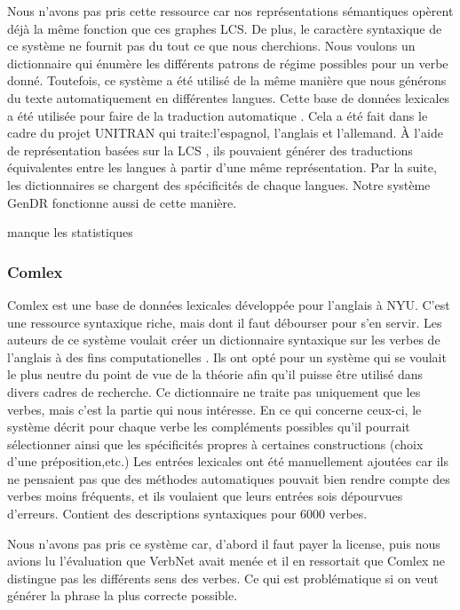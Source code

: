 Nous n'avons pas pris cette ressource car nos représentations sémantiques opèrent déjà la même fonction que ces graphes LCS. De plus, le caractère syntaxique de ce système ne fournit pas du tout ce que nous cherchions. Nous voulons un dictionnaire qui énumère les différents patrons de régime possibles pour un verbe donné. Toutefois, ce système a été utilisé de la même manière que nous générons du texte automatiquement en différentes langues. Cette base de données lexicales a été utilisée pour faire de la traduction automatique \citep{DorrUseLexicalSemantics1992}. Cela a été fait dans le cadre du projet UNITRAN qui traite:l'espagnol, l'anglais et l'allemand. À l'aide de représentation basées sur la LCS , ils pouvaient générer des traductions équivalentes entre les langues à partir d'une même représentation. Par la suite, les dictionnaires se chargent des spécificités de chaque langues. Notre système GenDR fonctionne aussi de cette manière.

manque les statistiques

\subsubsection{Comlex}
Comlex est une base de données lexicales développée pour l'anglais à NYU. C'est une ressource syntaxique riche, mais dont il faut débourser pour s'en servir. Les auteurs de ce système voulait  créer un dictionnaire syntaxique sur les verbes de l'anglais à des fins computationelles \citep{Grishman:1994:CSB:991886.991931}. Ils ont opté pour un système qui se voulait le plus neutre du point de vue de la théorie afin qu'il puisse être utilisé dans divers cadres de recherche. Ce dictionnaire ne traite pas uniquement que les verbes, mais c'est la partie qui nous intéresse. En ce qui concerne ceux-ci, le système décrit pour chaque verbe les compléments possibles qu'il pourrait sélectionner ainsi que les spécificités propres à certaines constructions (choix d'une préposition,etc.) Les entrées lexicales ont été manuellement ajoutées car ils ne pensaient pas que des méthodes automatiques pouvait bien rendre compte des verbes moins fréquents, et ils voulaient que leurs entrées sois dépourvues d'erreurs. Contient des descriptions syntaxiques pour 6000 verbes. 

Nous n'avons pas pris ce système car, d'abord il faut payer la license, puis nous avions lu l'évaluation que VerbNet avait menée et il en ressortait que Comlex ne distingue pas les  différents sens des verbes. Ce qui est problématique si on veut générer la phrase la plus correcte possible.

